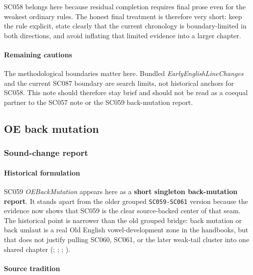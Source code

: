 \documentclass[
  british,
  a4paper,
]{article}
\begin{document}
SC058 belongs here because residual completion requires final prose even
for the weakest ordinary rules. The honest final treatment is therefore
very short: keep the rule explicit, state clearly that the current
chronology is boundary-limited in both directions, and avoid inflating
that limited evidence into a larger chapter.

\paragraph{Remaining cautions}\label{remaining-cautions-36}

The methodological boundaries matter here. Bundled
\emph{EarlyEnglishLineChanges} and the current SC087 boundary are search
limits, not historical anchors for SC058. This note should therefore
stay brief and should not be read as a coequal partner to the SC057 note
or the SC059 back-mutation report.

\subsection{OE back mutation}\label{oe-back-mutation}

\subsubsection{Sound-change report}\label{sound-change-report-37}

\paragraph{Historical formulation}\label{historical-formulation-37}

SC059 \emph{OEBackMutation} appears here as a \textbf{short singleton
back-mutation report}. It stands apart from the older grouped
\texttt{SC059-SC061} version because the evidence now shows that SC059
is the clear source-backed center of that seam. The historical point is
narrower than the old grouped bridge: back mutation or back umlaut is a
real Old English vowel-development zone in the handbooks, but that does
not justify pulling SC060, SC061, or the later weak-tail cluster into
one shared chapter (; ;
;
).

\paragraph{Source tradition}\label{source-tradition-37}
\end{document}
